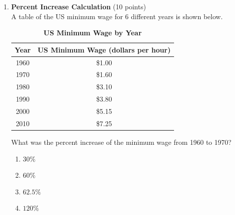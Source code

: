\begin{enumerate}
  \newpage

  \item \textbf{Percent Increase Calculation} (10 points)\\
  A table of the US minimum wage for 6 different years is shown below.
  \begin{table}[h!]
  \centering
  \renewcommand{\arraystretch}{1.3}
  \setlength{\tabcolsep}{8pt}
  \caption*{\textbf{US Minimum Wage by Year}}
  \begin{tabular}{|c|c|}
  \hline
  \rowcolor[HTML]{E0E0E0}
  \textbf{Year} & \textbf{US Minimum Wage (dollars per hour)} \\
  \hline
  1960 & \$1.00 \\
  \hline
  1970 & \$1.60 \\
  \hline
  1980 & \$3.10 \\
  \hline
  1990 & \$3.80 \\
  \hline
  2000 & \$5.15 \\
  \hline
  2010 & \$7.25 \\
  \hline
  \end{tabular}
  \end{table}
  What was the percent increase of the minimum wage from 1960 to 1970?
  \begin{enumerate}[label=(\Alph*)]
    \item $30\%$
    \item $60\%$
    \item $62.5\%$
    \item $120\%$
  \end{enumerate}
  \begin{subanswer}
  \end{subanswer}


\end{enumerate}
